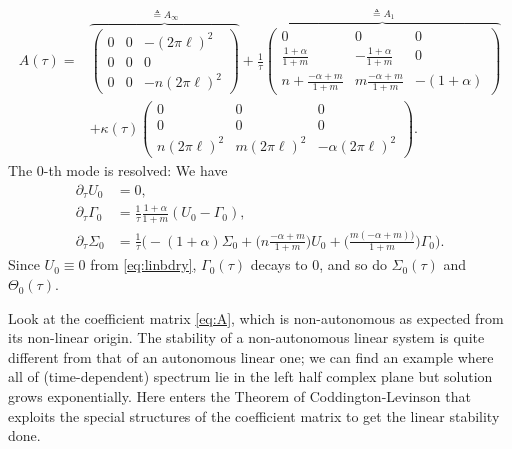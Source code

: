 \documentclass[a4paper,11pt]{article}
\def\l{(2\pi \ell)}
\theoremstyle{remark}
\begin{document}
\begin{equation} 
\begin{aligned}
  A(\tau)=
  &\overbrace{\begin{pmatrix}
   0 & 0 & -\l^2\\
   0 & 0 & 0\\
   0 & 0 & -n\l^2 
  \end{pmatrix} }^{\triangleq A_\infty}
  + \frac{1}{\tau}   
  \overbrace{\begin{pmatrix}
   0 & 0 & 0\\
   \frac{1+\alpha}{1+m} & -\frac{1+\alpha}{1+m} & 0\\
   n+ \frac{-\alpha+m}{1+m} & m\frac{-\alpha+m}{1+m}& -(1+\alpha)
  \end{pmatrix} }^{\triangleq A_1}\\
  &+\kappa(\tau) \begin{pmatrix}
   0 & 0 & 0\\
   0 & 0 & 0\\
   n\l^2 & m\l^2 & -\alpha\l^2 
  \end{pmatrix}.%
\end{aligned} \label{eq:A}
\end{equation}
The $0$-th mode is resolved: We have
\begin{align*}
   \partial_\tau U_0 &= 0,\\
  \partial_\tau\Gamma_0 &= \frac{1}{\tau}\frac{1+\alpha}{1+m}(U_0-\Gamma_0),\\
  \partial_\tau\Sigma_0 &= \frac{1}{\tau}\Big( -(1+\alpha)\Sigma_0 + \big(n\frac{-\alpha+m}{1+m}\big)U_0 + \big(\frac{m(-\alpha+m))}{1+m}\big)\Gamma_0\Big).
\end{align*}
Since $U_0\equiv0$ from \eqref{eq:linbdry}, $\Gamma_0(\tau)$ decays to $0$, and so do $\Sigma_0(\tau)$ and $\Theta_0(\tau)$.


Look at the coefficient matrix \eqref{eq:A}, which is non-autonomous as expected from its non-linear origin. The stability of a non-autonomous linear system is quite different from that of an autonomous linear one; we can find an example where all of (time-dependent) spectrum lie in the left half complex plane but solution grows exponentially. Here enters the Theorem of Coddington-Levinson that exploits the special structures of the coefficient matrix to get the linear stability done. 
\end{document}
